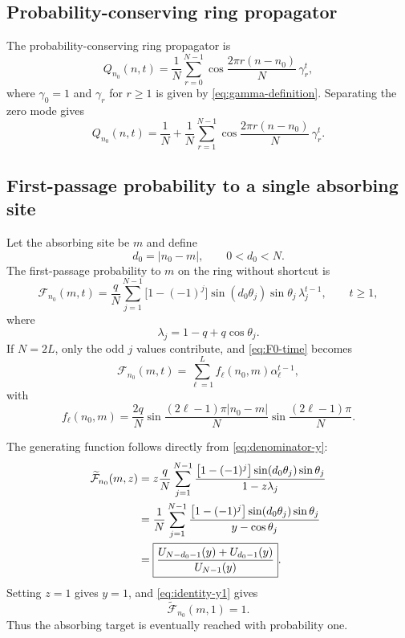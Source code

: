 \documentclass[11pt]{article}
\newcommand{\wt}{\widetilde}
\newcommand{\abs}[1]{\left|#1\right|}
\begin{document}
\subsection{Probability-conserving ring propagator}

The probability-conserving ring propagator is
\begin{equation}
  Q_{n_0}(n,t)=\frac1N\sum_{r=0}^{N-1}
  \cos\frac{2\pi r(n-n_0)}{N}\,
  \gamma_r^t,
  \label{eq:Q-full}
\end{equation}
where $\gamma_0=1$ and $\gamma_r$ for $r\geq1$ is given by
\eqref{eq:gamma-definition}.  Separating the zero mode gives
\begin{equation}
  Q_{n_0}(n,t)=\frac1N+\frac1N\sum_{r=1}^{N-1}
  \cos\frac{2\pi r(n-n_0)}{N}\,\gamma_r^t.
  \label{eq:Q-separated}
\end{equation}

\subsection{First-passage probability to a single absorbing site}

Let the absorbing site be $m$ and define
\begin{equation}
  d_0=\abs{n_0-m},\qquad 0<d_0<N.
\end{equation}
The first-passage probability to $m$ on the ring without shortcut is
\begin{equation}
  \boxed{
  \mathcal F_{n_0}(m,t)=
  \frac{q}{N}\sum_{j=1}^{N-1}
  \bigl[1-(-1)^j\bigr]\sin(d_0\theta_j)\sin\theta_j\,
  \lambda_j^{t-1},
  \qquad t\geq1,}
  \label{eq:F0-time}
\end{equation}
where
\begin{equation}
  \lambda_j=1-q+q\cos\theta_j.
\end{equation}
If $N=2L$, only the odd $j$ values contribute, and \eqref{eq:F0-time} becomes
\begin{equation}
  \mathcal F_{n_0}(m,t)=\sum_{\ell=1}^{L}f_\ell(n_0,m)\alpha_\ell^{t-1},
  \label{eq:F0-time-odd}
\end{equation}
with
\begin{equation}
  \boxed{
  f_\ell(n_0,m)=\frac{2q}{N}
  \sin\frac{(2\ell-1)\pi\abs{n_0-m}}{N}
  \sin\frac{(2\ell-1)\pi}{N}.}
  \label{eq:f-ell}
\end{equation}

The generating function follows directly from \eqref{eq:denominator-y}:
\begin{align}
  \wt{\mathcal F}_{n_0}(m,z)
  &=z\frac{q}{N}\sum_{j=1}^{N-1}
  \frac{\bigl[1-(-1)^j\bigr]\sin(d_0\theta_j)\sin\theta_j}
  {1-z\lambda_j} \notag\\
  &=\frac1N\sum_{j=1}^{N-1}
  \frac{\bigl[1-(-1)^j\bigr]\sin(d_0\theta_j)\sin\theta_j}
  {y-\cos\theta_j}\notag\\
  &=\boxed{\frac{U_{N-d_0-1}(y)+U_{d_0-1}(y)}{U_{N-1}(y)}}.
  \label{eq:F0-gen}
\end{align}
Setting $z=1$ gives $y=1$, and \eqref{eq:identity-y1} gives
\begin{equation}
  \wt{\mathcal F}_{n_0}(m,1)=1.
\end{equation}
Thus the absorbing target is eventually reached with probability one.
\end{document}
